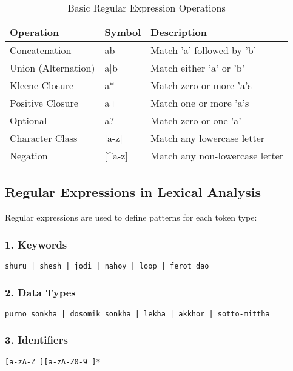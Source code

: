 \documentclass[12pt,a4paper]{article}
\begin{document}
\begin{table}[H]
\centering
\begin{tabular}{|l|l|l|}
\hline
\textbf{Operation} & \textbf{Symbol} & \textbf{Description} \\
\hline
Concatenation & ab & Match 'a' followed by 'b' \\
Union (Alternation) & a|b & Match either 'a' or 'b' \\
Kleene Closure & a* & Match zero or more 'a's \\
Positive Closure & a+ & Match one or more 'a's \\
Optional & a? & Match zero or one 'a' \\
Character Class & [a-z] & Match any lowercase letter \\
Negation & [\textasciicircum a-z] & Match any non-lowercase letter \\
\hline
\end{tabular}
\caption{Basic Regular Expression Operations}
\end{table}

\subsection{Regular Expressions in Lexical Analysis}

Regular expressions are used to define patterns for each token type:

\subsubsection{1. Keywords}
\begin{lstlisting}
shuru | shesh | jodi | nahoy | loop | ferot dao
\end{lstlisting}

\subsubsection{2. Data Types}
\begin{lstlisting}
purno sonkha | dosomik sonkha | lekha | akkhor | sotto-mittha
\end{lstlisting}

\subsubsection{3. Identifiers}
\begin{lstlisting}
[a-zA-Z_][a-zA-Z0-9_]*
\end{lstlisting}
\end{document}
